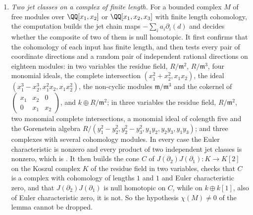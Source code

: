 \begin{enumerate}[label=\textup{(\Roman*)},leftmargin=*]
\item \emph{Two jet classes on a complex of finite length.} For a bounded
  complex $M$ of free modules over $\QQ[x_{1},x_{2}]$ or
  $\QQ[x_{1},x_{2},x_{3}]$ with finite length cohomology, the computation
  builds the jet chain maps $-\sum_{i}a_{i}\partial_{i}(d)$ and decides
  whether the composite of two of them is null homotopic. It first confirms
  that the cohomology of each input has finite length, and then tests every
  pair of coordinate directions and a random pair of independent rational
  directions on eighteen modules: in two
  variables the residue field, $R/\mathfrak{m}^{2}$, $R/\mathfrak{m}^{3}$,
  four monomial ideals, the complete intersection
  $(x_{1}^{2}+x_{2}^{2},x_{1}x_{2})$, the ideal
  $(x_{1}^{3}-x_{2}^{3},x_{1}^{2}x_{2},x_{1}x_{2}^{2})$, the non-cyclic
  modules $\mathfrak{m}/\mathfrak{m}^{3}$ and the cokernel of
  $\left(\begin{smallmatrix}x_{1}&x_{2}&0\\0&x_{1}&x_{2}\end{smallmatrix}\right)$,
  and $k\oplus R/\mathfrak{m}^{2}$; in three variables the residue field,
  $R/\mathfrak{m}^{2}$, two monomial complete intersections, a monomial
  ideal of colength five and the Gorenstein algebra
  $R/(y_{1}^{2}-y_{2}^{2},y_{2}^{2}-y_{3}^{2},y_{1}y_{2},y_{2}y_{3},y_{1}y_{3})$;
  and three complexes with several cohomology modules. In every case the
  Euler characteristic is nonzero and every product of two independent jet
  classes is nonzero, which is . It then builds the
  cone $C$ of $J(\partial_{2})J(\partial_{1})\colon K\to K[2]$ on the Koszul
  complex $K$ of the residue field in two variables, checks that $C$ is a
  complex with cohomology of lengths $1$ and $1$ and Euler characteristic
  zero, and that $J(\partial_{2})J(\partial_{1})$ is null homotopic on $C$,
  while on $k\oplus k[1]$, also of Euler characteristic zero, it is not. So
  the hypothesis $\chi(M)\ne0$ of the lemma cannot be dropped.


\end{enumerate}

